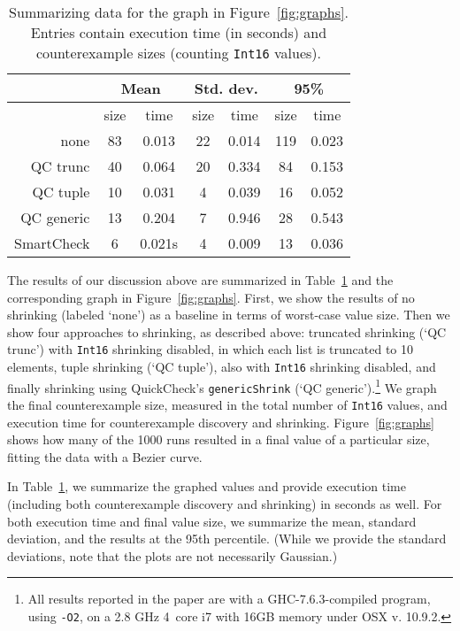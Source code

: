 \documentclass{sigplanconf}
\newcommand{\ttp}[1]{\texttt{#1}}
\begin{document}
\begin{table}[ht]
\footnotesize
  \begin{center}
    \begin{tabular}{|r||c|c|c|c|c|c|}
\hline

              & \multicolumn{2}{c}{Mean} & \multicolumn{2}{c}{Std. dev.} &
\multicolumn{2}{c}{95\%}\\\hline
              & size & time  & size & time & size & time \\\hline\hline
none          & 83 & 0.013   & 22 & 0.014   & 119 & 0.023\\\hline
QC trunc      & 40 & 0.064   & 20 & 0.334   & 84 & 0.153\\\hline
QC tuple      & 10 & 0.031   & 4  & 0.039   & 16 & 0.052\\\hline
QC generic    & 13 & 0.204   & 7  & 0.946   & 28 & 0.543\\\hline
SmartCheck    & 6 & 0.021s   & 4  & 0.009   & 13 & 0.036\\\hline

    \end{tabular}
  \end{center}
  \caption{Summarizing data for the graph in Figure~\ref{fig:graphs}. Entries
    contain execution time (in seconds) and counterexample sizes (counting
    \ttp{Int16} values).}
  \label{table:results}
\end{table}

The results of our discussion above are summarized in Table~\ref{table:results}
and the corresponding graph in Figure~\ref{fig:graphs}.  First, we show the
results of no shrinking (labeled `none') as a baseline in terms of worst-case
value size.  Then we show four approaches to shrinking, as described above:
truncated shrinking (`QC trunc') with \ttp{Int16} shrinking disabled, in which
each list is truncated to 10 elements, tuple shrinking (`QC tuple'), also with
\ttp{Int16} shrinking disabled, and finally shrinking using QuickCheck's
\ttp{genericShrink} (`QC generic').\footnote{All results
  reported in the paper are with a GHC-7.6.3-compiled program, using \ttp{-O2},
  on a 2.8 GHz 4~core i7 with 16GB memory under OSX v. 10.9.2.}  We graph the
final counterexample size, measured in the total number of \ttp{Int16} values,
and execution time for counterexample discovery and shrinking.
Figure~\ref{fig:graphs} shows how many of the 1000 runs resulted in a final
value of a particular size, fitting the data with a Bezier curve.

In Table~\ref{table:results}, we summarize the graphed values and provide
execution time (including both counterexample discovery and shrinking) in
seconds as well.  For both execution time and final value size, we summarize the
mean, standard deviation, and the results at the 95th percentile.
(While we provide the standard deviations, note that the plots are not
necessarily Gaussian.)
\end{document}
